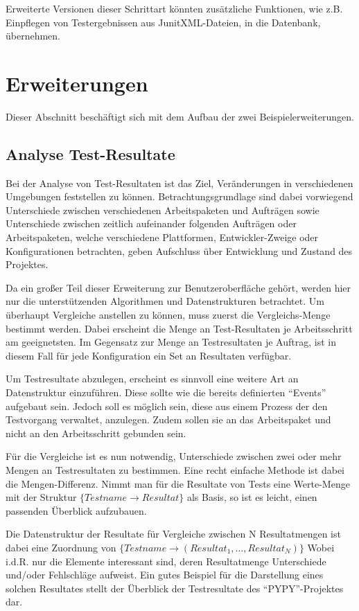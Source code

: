 Erweiterte Versionen dieser Schrittart könnten zusätzliche Funktionen,
wie z.B. Einpflegen von Testergebnissen aus JunitXML-Dateien, in die Datenbank,
übernehmen.


\section{Erweiterungen}
\label{sec:design:erweiterungen}

Dieser Abschnitt beschäftigt sich mit dem Aufbau der zwei Beispielerweiterungen.

\subsection{Analyse Test-Resultate}

Bei der Analyse von Test-Resultaten ist das Ziel,
Veränderungen in verschiedenen Umgebungen feststellen zu können.
Betrachtungsgrundlage sind dabei vorwiegend Unterschiede zwischen verschiedenen Arbeitspaketen und Aufträgen sowie Unterschiede zwischen zeitlich aufeinander folgenden Aufträgen oder Arbeitspaketen, welche verschiedene Plattformen, Entwickler-Zweige oder Konfigurationen betrachten, geben Aufschluss über Entwicklung und Zustand des Projektes.

Da ein großer Teil dieser Erweiterung zur Benutzeroberfläche gehört,
werden hier nur die unterstützenden Algorithmen und Datenstrukturen betrachtet.
Um überhaupt Vergleiche anstellen zu können, muss zuerst die Vergleichs-Menge bestimmt werden. Dabei erscheint die Menge an Test-Resultaten je Arbeitsschritt am geeignetsten. Im Gegensatz zur Menge an Testresultaten je Auftrag,
ist in diesem Fall für jede Konfiguration ein Set an Resultaten verfügbar.

Um Testresultate abzulegen, erscheint es sinnvoll eine weitere Art an Datenstruktur einzuführen.
Diese sollte wie die bereits definierten ``Events'' aufgebaut sein.
Jedoch soll es möglich sein, diese aus einem Prozess der den Testvorgang verwaltet,
anzulegen. Zudem sollen sie an das Arbeitspaket und nicht an den Arbeitsschritt gebunden sein.

Für die Vergleiche ist es nun notwendig,
Unterschiede zwischen zwei oder mehr Mengen an Testresultaten zu bestimmen.
Eine recht einfache Methode ist dabei die Mengen-Differenz.
Nimmt man für die Resultate von Tests eine Werte-Menge mit der Struktur $\{ Testname \rightarrow Resultat \}$ als Basis,
so ist es leicht, einen passenden Überblick aufzubauen.

Die Datenstruktur der Resultate für Vergleiche zwischen N Resultatmengen
ist dabei eine Zuordnung von
$\{ Testname \rightarrow ( Resultat_{1},\ldots,Resultat_{N})\}$
Wobei i.d.R. nur die Elemente interessant sind,
deren Resultatmenge Unterschiede und/oder Fehlschläge aufweist.
Ein gutes Beispiel für die Darstellung eines solchen Resultates
stellt der Überblick der Testresultate des ``PYPY''-Projektes \cite{pypy:overview} dar.

